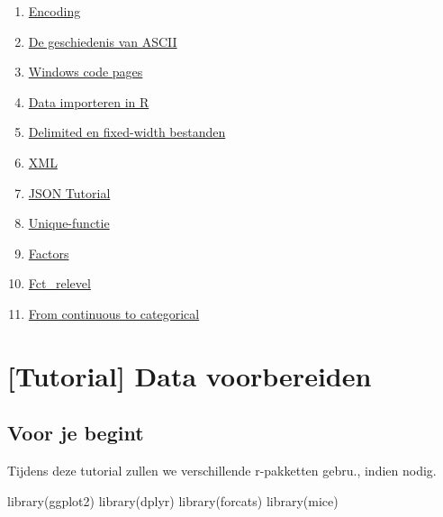 \documentclass[]{tufte-book}
\newenvironment{Shaded}{}{}
\newcommand{\FunctionTok}[1]{\textcolor[rgb]{0.02,0.16,0.49}{#1}}
\newcommand{\NormalTok}[1]{#1}
\providecommand{\tightlist}{%
  \setlength{\itemsep}{0pt}\setlength{\parskip}{0pt}}
\begin{document}
\begin{enumerate}
\def\labelenumi{\arabic{enumi}.}
\tightlist
\item
  \href{http://kunststube.net/encoding/}{Encoding}
\item
  \href{https://www.joelonsoftware.com/2003/10/08/the-absolute-minimum-every-software-developer-absolutely-positively-must-know-about-unicode-and-character-sets-no-excuses/}{De geschiedenis van ASCII}
\item
  \href{https://en.wikipedia.org/wiki/Windows_code_page}{Windows code pages}
\item
  \href{http://r4ds.had.co.nz/data-import.html}{Data importeren in R}
\item
  \href{https://www.techwalla.com/articles/what-is-a-delimited-a-fixed-width-file}{Delimited en fixed-width bestanden}
\item
  \href{https://www.w3schools.com/xml/default.asp}{XML}
\item
  \href{http://beginnersbook.com/2015/04/json-tutorial/}{JSON Tutorial}
\item
  \href{https://chemicalstatistician.wordpress.com/2018/03/10/use-unique-instead-of-levels-to-find-the-possible-values-of-a-character-variable-in-r/}{Unique-functie}
\item
  \href{http://r4ds.had.co.nz/factors.html}{Factors}
\item
  \href{http://forcats.tidyverse.org/reference/fct_relevel.html}{Fct\_relevel}
\item
  \href{http://rforpublichealth.blogspot.be/2012/09/from-continuous-to-categorical.html}{From continuous to categorical}
\end{enumerate}

\hypertarget{tutorial-data-voorbereiden}{%
\chapter{{[}Tutorial{]} Data voorbereiden}\label{tutorial-data-voorbereiden}}

\hypertarget{voor-je-begint-2}{%
\section{Voor je begint}\label{voor-je-begint-2}}

Tijdens deze tutorial zullen we verschillende r-pakketten gebru., indien nodig.

\begin{Shaded}
\begin{Highlighting}[]
\FunctionTok{library}\NormalTok{(ggplot2)}
\FunctionTok{library}\NormalTok{(dplyr)}
\FunctionTok{library}\NormalTok{(forcats)}
\FunctionTok{library}\NormalTok{(mice)}
\end{Highlighting}
\end{Shaded}
\end{document}

